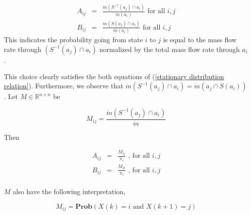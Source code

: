 \documentclass{article}
\begin{document}
  \begin{eqnarray*}
   A_{ij} &=& \frac{ \dot{m}\left(S^{-1}(a_j) \cap a_i\right)}{\dot{m}(a_i)} \mbox{  for all } i,j  \\
   B_{ij} &=& \frac{\dot{m}\left(S(a_j) \cap a_i\right)}{\dot{m}(a_i)} \mbox{  for all } i,j
  \end{eqnarray*} 
This indicates the probability going from state $i$ to $j$ is equal to the mass flow rate through $\left(S^{-1}(a_j) \cap a_i\right)$ normalized by the total mass flow rate through $a_i$. 


%

This choice clearly satisfies the both equations of (\ref{stationary distribution relation}). Furthermore, we observe that $ \dot{m}\left(S^{-1}(a_j)\cap a_i\right) = \dot{m}\left(a_j \cap S(a_i)\right)$. Let $M \in \mathbb{R}^{n \times n}$ be

  \begin{equation*}
     M_{ij} = \frac{\dot{m}\left(S^{-1}(a_j)\cap a_i\right)}{\dot{m}}
  \end{equation*}

Then 

  \begin{eqnarray*}
     A_{ij} & =& \frac{M_{ij}}{\pi_i}  \mbox{ , for all } i,j\\
     B_{ij} & =& \frac{M_{ji}}{\pi_i}  \mbox{ , for all } i,j\\
  \end{eqnarray*}

$M$ also have the following interpretation,

  \begin{equation*}
     M_{ij} = \mathbf{Prob}\left(  X(k) = i \mbox{ and } X(k+1) = j   \right)
  \end{equation*}
\end{document}
